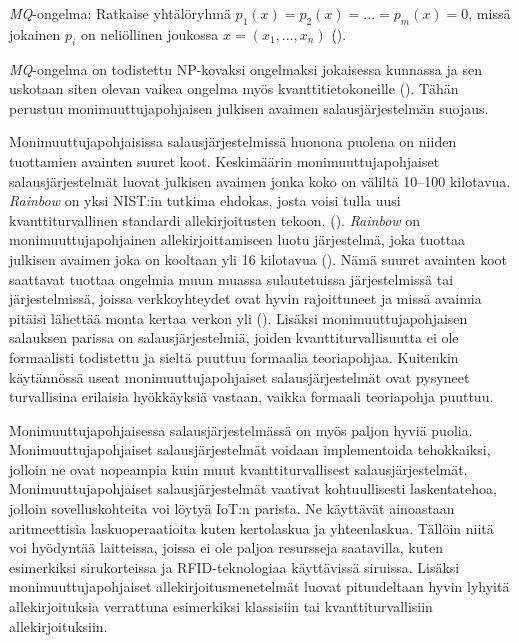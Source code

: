 \emph{MQ}-ongelma: Ratkaise yhtälöryhmä $p_{1}(x) = p_{2}(x) = ... = p_ {m}(x) = 0$, missä jokainen $p_{i}$ on neliöllinen joukossa $x = (x_{1}, ..., x_{n})$ (\cite{Ding2009}).

\emph{MQ}-ongelma on todistettu NP-kovaksi ongelmaksi jokaisessa kunnassa ja sen uskotaan siten olevan vaikea ongelma myös kvanttitietokoneille (\cite{8012305}). Tähän perustuu monimuuttujapohjaisen julkisen avaimen salausjärjestelmän suojaus.

Monimuuttujapohjaisissa salausjärjestelmissä huonona puolena on niiden tuottamien avainten suuret koot. Keskimäärin monimuuttujapohjaiset salausjärjestelmät luovat julkisen avaimen jonka koko on väliltä 10--100 kilotavua. \emph{Rainbow} on yksi NIST:in tutkima ehdokas, josta voisi tulla uusi kvanttiturvallinen standardi allekirjoitusten tekoon. (\cite{alagic2020status}). \emph{Rainbow} on monimuuttujapohjainen allekirjoittamiseen luotu järjestelmä, joka tuottaa julkisen avaimen joka on kooltaan yli 16 kilotavua (\cite{Ding2009}). Nämä suuret avainten koot saattavat tuottaa ongelmia muun muassa sulautetuissa järjestelmissä tai järjestelmissä, joissa verkkoyhteydet ovat hyvin rajoittuneet ja missä avaimia pitäisi lähettää monta kertaa verkon yli (\cite{8012305}). Lisäksi monimuuttujapohjaisen salauksen parissa on salausjärjestelmiä, joiden kvanttiturvallisuutta ei ole formaalisti todistettu ja sieltä puuttuu formaalia teoriapohjaa. Kuitenkin käytännössä useat monimuuttujapohjaiset salausjärjestelmät ovat pysyneet turvallisina erilaisia hyökkäyksiä vastaan, vaikka formaali teoriapohja puuttuu.

Monimuuttujapohjaisessa salausjärjestelmässä on myös paljon hyviä puolia. Monimuuttujapohjaiset salausjärjestelmät voidaan implementoida tehokkaiksi, jolloin ne ovat nopeampia kuin muut kvanttiturvallisest salausjärjestelmät. Monimuuttujapohjaiset salausjärjestelmät vaativat kohtuullisesti laskentatehoa, jolloin sovelluskohteita voi löytyä IoT:n parista. Ne käyttävät ainoastaan aritmeettisia laskuoperaatioita kuten kertolaskua ja yhteenlaskua. Tällöin niitä voi hyödyntää laitteissa, joissa ei ole paljoa resursseja saatavilla, kuten esimerkiksi sirukorteissa ja RFID-teknologiaa käyttävissä siruissa. Lisäksi monimuuttujapohjaiset allekirjoitusmenetelmät luovat pituudeltaan hyvin lyhyitä allekirjoituksia verrattuna esimerkiksi klassisiin tai kvanttiturvallisiin allekirjoituksiin.
